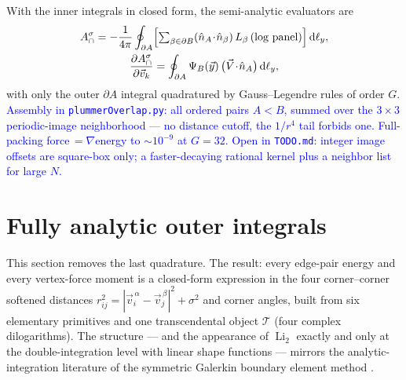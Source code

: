 \documentclass[11pt]{article}
\newcommand{\aside}[1]{\textcolor{blue}{#1}}
\newcommand{\Li}{\operatorname{Li}_2}
\newcommand{\dd}{\,\mathrm{d}}
\newcommand{\nA}{\hat n_A}
\newcommand{\Acap}{A^{\sigma}_{\cap}}
\begin{document}
With the inner integrals in closed form, the semi-analytic evaluators are
\begin{equation}
\begin{gathered}
  \Acap = -\frac{1}{4\pi}\oint_{\partial A}
          \Bigl[\textstyle\sum_{\beta\in\partial B}(\nA\!\cdot\!\hat n_\beta)\,
          L_\beta\,(\text{log panel})\Bigr]\dd\ell_y ,\\
  \frac{\partial\Acap}{\partial\vec v_k}
  = \oint_{\partial A}\Psi_B(\vec y)\,\bigl(\vec V\!\cdot\!\nA\bigr)\dd\ell_y ,
\end{gathered}
  \label{eq:semianalytic}
\end{equation}
with only the outer $\partial A$ integral quadratured by Gauss--Legendre rules
\cite{GolubWelsch1969} of order $G$.  \aside{Assembly in \texttt{plummerOverlap.py}:
all ordered pairs $A<B$, summed over the $3\times3$ periodic-image neighborhood ---
no distance cutoff, the $1/r^4$ tail forbids one.  Full-packing
force$\,=\nabla$energy to $\sim10^{-9}$ at $G=32$.  Open in \texttt{TODO.md}: integer
image offsets are square-box only; a faster-decaying rational kernel plus a neighbor
list for large $N$.}

\section{Fully analytic outer integrals}
\label{sec:outer}

This section removes the last quadrature.  The result: every edge-pair energy and
every vertex-force moment is a closed-form expression in the four corner--corner
softened distances $r_{ij}^2=|\vec v_i^{\,\alpha}-\vec v_j^{\,\beta}|^2+\sigma^2$ and
corner angles, built from six elementary primitives and one transcendental object
$\mathcal T$ (four complex dilogarithms).  The structure --- and the appearance of
$\Li$ exactly and only at the double-integration level with linear shape functions
--- mirrors the analytic-integration literature of the symmetric Galerkin boundary
element method \cite{Carini1999,Salvadori2002,SauterSchwab2011,FratantonioRencis2000}.
\end{document}
